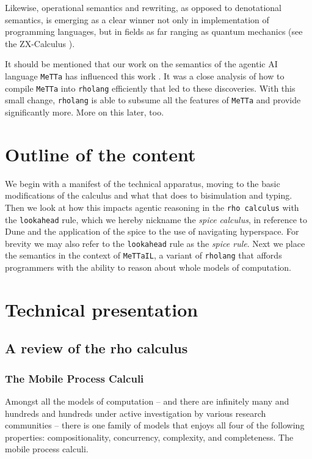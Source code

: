 \documentclass{article}
\newcommand{\code}[1]{\texttt{#1}}
\begin{document}
\medskip

Likewise, operational semantics and rewriting, as opposed to denotational semantics, is emerging as a clear winner not only in implementation of programming languages, but in fields as far ranging as quantum mechanics (see the ZX-Calculus \cite{DBLP:journals/corr/abs-2303-03163}).

\medskip

It should be mentioned that our work on the semantics of the agentic AI language \code{MeTTa} has influenced this work \cite{meredith2023metamettaoperationalsemanticsmetta}. It was a close analysis of how to compile \code{MeTTa} into \code{rholang} efficiently that led to these discoveries. With this small change, \code{rholang} is able to subsume all the features of \code{MeTTa} and provide significantly more. More on this later, too.

\section{Outline of the content}

We begin with a manifest of the technical apparatus, moving to the basic modifications of the calculus and what that does to bisimulation and typing. Then we look at how this impacts agentic reasoning in the \code{rho calculus} with the \code{lookahead} rule, which we hereby nickname the \emph{spice calculus}, in reference to Dune and the application of the spice to the use of navigating hyperspace. For brevity we may also refer to the \code{lookahead} rule as the \emph{spice rule}. Next we place the semantics in the context of \code{MeTTaIL}, a variant of \code{rholang} that affords programmers with the ability to reason about whole models of computation.

\section{Technical presentation}
\subsection{A review of the rho calculus}
\subsubsection{The Mobile Process Calculi}

Amongst all the models of computation – and there are infinitely many and hundreds and hundreds under active investigation by various research communities – there is one family of models that enjoys all four of the following properties: compositionality, concurrency, complexity, and completeness. The mobile process calculi.
\end{document}
